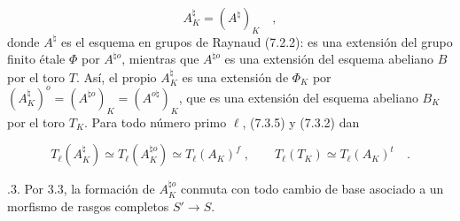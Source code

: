 \begin{equation}\tag{7.6.1}
A_K^{\natural}=(A^{\natural})_K \quad ,
\end{equation}
donde $A^{\natural}$ es el esquema en grupos de Raynaud (7.2.2): es una
extensión del grupo finito étale $\Phi$ por $A^{\natural o}$, mientras
que $A^{\natural o}$ es una extensión del esquema abeliano $B$ por el
toro $T$. Así, el propio $A_K^{\natural}$ es una extensión de $\Phi_K$
por
$(A_K^{\natural})^o=(A^{\natural o})_K=(A^{o\natural})_K$, que es una
extensión del esquema abeliano $B_K$ por el toro $T_K$. Para todo número
primo $\ell$, (7.3.5) y (7.3.2) dan

\begin{equation}\tag{7.6.2}
T_{\ell}(A_K^{\natural}) \simeq T_{\ell}(A_K^{\natural o})
 \simeq T_{\ell}(A_K)^f \; , \qquad
T_{\ell}(T_K) \simeq T_{\ell}(A_K)^t \quad .
\end{equation}

\medskip
{}.3. Por 3.3, la formación de $A_K^{\natural o}$ conmuta con todo
cambio de base asociado a un morfismo de rasgos completos
$S'\longrightarrow S$.
